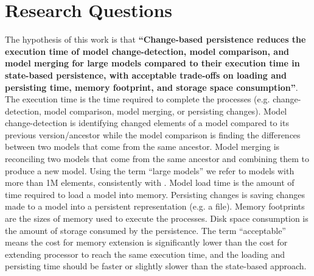 \documentclass[12pt, a4paper]{report} \usepackage[titletoc]{appendix}
\begin{document}
\section{Research Questions}
\label{sec:research_questions}
The hypothesis of this work is that \textbf{``Change-based persistence reduces the execution time of model change-detection, model comparison, and model merging for large models compared to their execution time in state-based persistence, with acceptable trade-offs on loading and persisting time, memory footprint, and storage space consumption''}. The execution time is the time required to complete the processes (e.g. change-detection, model comparison, model merging, or persisting changes). Model change-detection is identifying changed elements of a model compared to its previous version/ancestor while the model comparison is finding the differences between two models that come from the same ancestor. Model merging is reconciling two models that come from the same ancestor and combining them to produce a new model. Using the term ``large models'' we refer to models with more than 1M elements, consistently with \cite{daniel2016neoemf,DBLP:conf/models/Espinazo-PaganCM11}. Model load time is the amount of time required to load a model into memory. Persisting changes is saving changes made to a model into a persistent representation (e.g. a file). Memory footprints are the sizes of memory used to execute the processes. Disk space consumption is the amount of storage consumed by the persistence. The term ``acceptable'' means the cost for memory extension is significantly lower than the cost for extending processor to reach the same execution time, and the loading and persisting time should be faster or slightly slower than the state-based approach.\\
\end{document}

